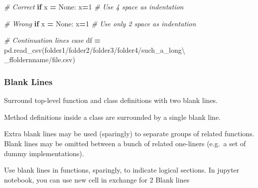 \documentclass[
]{book}
\newenvironment{Shaded}{\begin{snugshade}}{\end{snugshade}}
\newcommand{\CommentTok}[1]{\textcolor[rgb]{0.56,0.35,0.01}{\textit{#1}}}
\newcommand{\ControlFlowTok}[1]{\textcolor[rgb]{0.13,0.29,0.53}{\textbf{#1}}}
\newcommand{\DecValTok}[1]{\textcolor[rgb]{0.00,0.00,0.81}{#1}}
\newcommand{\NormalTok}[1]{#1}
\newcommand{\OperatorTok}[1]{\textcolor[rgb]{0.81,0.36,0.00}{\textbf{#1}}}
\newcommand{\StringTok}[1]{\textcolor[rgb]{0.31,0.60,0.02}{#1}}
\newcommand{\VariableTok}[1]{\textcolor[rgb]{0.00,0.00,0.00}{#1}}
\begin{document}
\begin{Shaded}
\begin{Highlighting}[]
\CommentTok{\# Correct }
\ControlFlowTok{if}\NormalTok{ x }\OperatorTok{=} \VariableTok{None}\NormalTok{: }
\NormalTok{    x}\OperatorTok{=}\DecValTok{1} \CommentTok{\# Use 4 space as indentation}

\CommentTok{\# Wrong }
\ControlFlowTok{if}\NormalTok{ x }\OperatorTok{=} \VariableTok{None}\NormalTok{:}
\NormalTok{  x}\OperatorTok{=}\DecValTok{1} \CommentTok{\# Use only 2 space as indentation}

\CommentTok{\# Continuation lines case }
\NormalTok{df }\OperatorTok{=}\NormalTok{ pd.read\_csv(}\StringTok{\textquotesingle{}folder1/folder2/folder3/folder4/such\_a\_long\textbackslash{}}
\StringTok{                 \_ffoldernname/file.csv\textquotesingle{}}\NormalTok{)}
\end{Highlighting}
\end{Shaded}

\hypertarget{blank-lines}{%
\subsubsection{Blank Lines}\label{blank-lines}}

Surround top-level function and class definitions with two blank lines.

Method definitions inside a class are surrounded by a single blank line.

Extra blank lines may be used (sparingly) to separate groups of related functions. Blank lines may be omitted between a bunch of related one-liners (e.g.~a set of dummy implementations).

Use blank lines in functions, sparingly, to indicate logical sections.
In jupyter notebook, you can use new cell in exchange for 2 Blank lines
\end{document}
